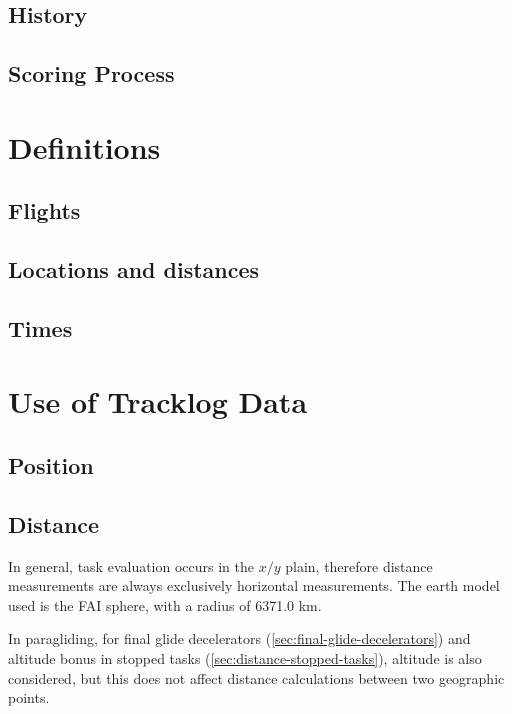 \documentclass{article}
\begin{document}
\subsection{History}
\subsection{Scoring Process}

\newpage
\section{Definitions}
\subsection{Flights}
\subsection{Locations and distances}
\subsection{Times}

\newpage
\section{Use of Tracklog Data}
\subsection{Position}
\subsection{Distance}
\label{sec:distance}
In general, task evaluation occurs in the \(x/y\) plain, therefore distance
measurements are always exclusively horizontal measurements. The earth model used
is the FAI sphere, with a radius of 6371.0 km.

\colorbox{pgc}{\begin{minipage}{\textwidth}
In paragliding, for final glide decelerators (\ref{sec:final-glide-decelerators})
and altitude bonus in stopped tasks (\ref{sec:distance-stopped-tasks}), altitude
is also considered, but this does not affect distance calculations between two
geographic points.
\end{minipage}}
\end{document}
